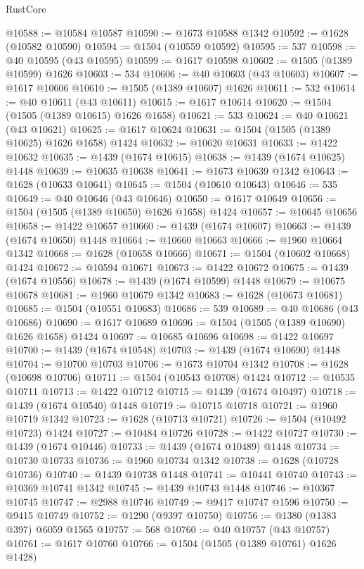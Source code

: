 \begin{lexlean}{RustCore}
\begin{coremodule}
@10588 := @10584 @10587
@10590 := @1673 @10588 @1342
@10592 := @1628 (@10582 @10590)
@10594 := @1504 (@10559 @10592)
@10595 := 537
@10598 := @40 @10595 (@43 @10595)
@10599 := @1617 @10598
@10602 := @1505 (@1389 @10599) @1626
@10603 := 534
@10606 := @40 @10603 (@43 @10603)
@10607 := @1617 @10606
@10610 := @1505 (@1389 @10607) @1626
@10611 := 532
@10614 := @40 @10611 (@43 @10611)
@10615 := @1617 @10614
@10620 := @1504 (@1505 (@1389 @10615) @1626 @1658)
@10621 := 533
@10624 := @40 @10621 (@43 @10621)
@10625 := @1617 @10624
@10631 := @1504 (@1505 (@1389 @10625) @1626 @1658) @1424
@10632 := @10620 @10631
@10633 := @1422 @10632
@10635 := @1439 (@1674 @10615)
@10638 := @1439 (@1674 @10625) @1448
@10639 := @10635 @10638
@10641 := @1673 @10639 @1342
@10643 := @1628 (@10633 @10641)
@10645 := @1504 (@10610 @10643)
@10646 := 535
@10649 := @40 @10646 (@43 @10646)
@10650 := @1617 @10649
@10656 := @1504 (@1505 (@1389 @10650) @1626 @1658) @1424
@10657 := @10645 @10656
@10658 := @1422 @10657
@10660 := @1439 (@1674 @10607)
@10663 := @1439 (@1674 @10650) @1448
@10664 := @10660 @10663
@10666 := @1960 @10664 @1342
@10668 := @1628 (@10658 @10666)
@10671 := @1504 (@10602 @10668) @1424
@10672 := @10594 @10671
@10673 := @1422 @10672
@10675 := @1439 (@1674 @10556)
@10678 := @1439 (@1674 @10599) @1448
@10679 := @10675 @10678
@10681 := @1960 @10679 @1342
@10683 := @1628 (@10673 @10681)
@10685 := @1504 (@10551 @10683)
@10686 := 539
@10689 := @40 @10686 (@43 @10686)
@10690 := @1617 @10689
@10696 := @1504 (@1505 (@1389 @10690) @1626 @1658) @1424
@10697 := @10685 @10696
@10698 := @1422 @10697
@10700 := @1439 (@1674 @10548)
@10703 := @1439 (@1674 @10690) @1448
@10704 := @10700 @10703
@10706 := @1673 @10704 @1342
@10708 := @1628 (@10698 @10706)
@10711 := @1504 (@10543 @10708) @1424
@10712 := @10535 @10711
@10713 := @1422 @10712
@10715 := @1439 (@1674 @10497)
@10718 := @1439 (@1674 @10540) @1448
@10719 := @10715 @10718
@10721 := @1960 @10719 @1342
@10723 := @1628 (@10713 @10721)
@10726 := @1504 (@10492 @10723) @1424
@10727 := @10484 @10726
@10728 := @1422 @10727
@10730 := @1439 (@1674 @10446)
@10733 := @1439 (@1674 @10489) @1448
@10734 := @10730 @10733
@10736 := @1960 @10734 @1342
@10738 := @1628 (@10728 @10736)
@10740 := @1439 @10738 @1448
@10741 := @10441 @10740
@10743 := @10369 @10741 @1342
@10745 := @1439 @10743 @1448
@10746 := @10367 @10745
@10747 := @2988 @10746
@10749 := @9417 @10747 @1596
@10750 := @9415 @10749
@10752 := @1290 (@9397 @10750)
@10756 := @1380 (@1383 @397) @6059 @1565
@10757 := 568
@10760 := @40 @10757 (@43 @10757)
@10761 := @1617 @10760
@10766 := @1504 (@1505 (@1389 @10761) @1626 @1428)

\end{coremodule}
\end{lexlean}
